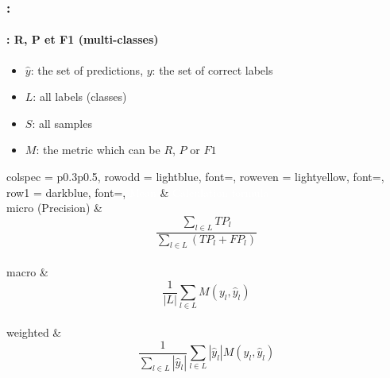 \documentclass[xcolor=table]{beamer}
\begin{document}
\begin{frame}
	\frametitle{\insertshortsubtitle: \insertsection}
	\framesubtitle{\insertsubsection: R, P et F1 (multi-classes)}

	\begin{itemize}
		\item $\hat{y}$: the set of predictions, $y$: the set of correct labels
		\item $L$: all labels (classes)
		\item $S$: all samples
		\item $M$: the metric which can be $R$, $P$ or $F1$
	\end{itemize}

	\begin{center}
		\begin{tblr}{
				colspec = {p{0.3\textwidth}p{0.5\textwidth}},
				row{odd} = {lightblue, font=\small},
				row{even} = {lightyellow, font=\small},
				row{1} = {darkblue, font=\bfseries},
			}
			\textcolor{white}{Mean} & \textcolor{white}{Calculation formula} \\
			micro (Precision) & \vspace{-6pt}\[\frac{\sum_{l \in L} TP_l}{\sum_{l \in L} (TP_l + FP_l)}\]\vspace{-6pt} \\
			macro & \vspace{-6pt}\[\frac{1}{|L|} \sum_{l \in L} M(y_l, \hat{y}_l)\]\vspace{-6pt}\\
			weighted & \vspace{-6pt}\[\frac{1}{\sum_{l \in L} |\hat{y}_l|} \sum_{l \in L} |\hat{y}_l| M(y_l, \hat{y}_l)\]\vspace{-6pt} \\
		\end{tblr}
	\end{center}
	
\end{frame}
\end{document}
